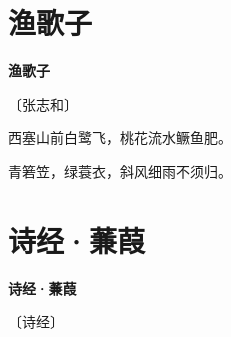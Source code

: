 \documentclass[12pt,UTF-8,openany,fontset=none]{ctexbook}
\begin{document}
\vspace{8pt}
\clearpage

\section{渔歌子}


\begin{center}
    {\bfseries 渔歌子}

    \vspace{18pt}

    \begin{large}\xuwen
        〔张志和〕
    \end{large}

\end{center}

    \vspace{18pt}  %

\begin{center}
    \begin{Large}

        西塞山前白鹭飞，桃花流水鳜鱼肥。

        青箬笠，绿蓑衣，斜风细雨不须归。

    \end{Large}

\end{center}

\vspace{8pt}
\clearpage

\section{诗经·蒹葭}


\begin{center}
    {\bfseries 诗经·蒹葭}

    \vspace{18pt}

    \begin{large}\xuwen
        〔诗经〕
    \end{large}

\end{center}

    \vspace{18pt}  %
\end{document}
